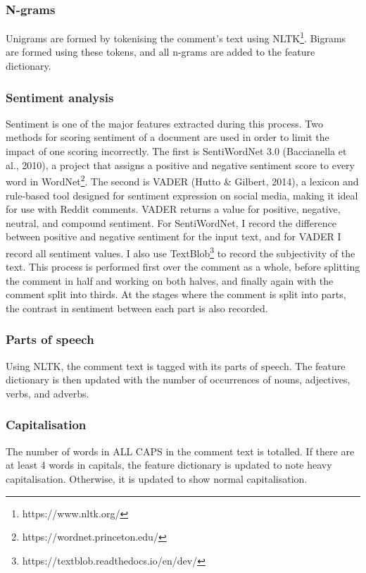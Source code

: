 \documentclass[a4paper,12pt]{article}
\begin{document}
\subsubsection{N-grams}
Unigrams are formed by tokenising the comment's text using NLTK\footnote{https://www.nltk.org/}. Bigrams are formed using these tokens, and all n-grams are added to the feature dictionary.

\subsubsection{Sentiment analysis}
Sentiment is one of the major features extracted during this process. Two methods for scoring sentiment of a document are used in order to limit the impact of one scoring incorrectly. The first is SentiWordNet 3.0 (Baccianella et al., 2010), a project that assigns a positive and negative sentiment score to every word in WordNet\footnote{https://wordnet.princeton.edu/}. The second is VADER (Hutto \& Gilbert, 2014), a lexicon and rule-based tool designed for sentiment expression on social media, making it ideal for use with Reddit comments. VADER returns a value for positive, negative, neutral, and compound sentiment. For SentiWordNet, I record the difference between positive and negative sentiment for the input text, and for VADER I record all sentiment values. I also use TextBlob\footnote{https://textblob.readthedocs.io/en/dev/} to record the subjectivity of the text. This process is performed first over the comment as a whole, before splitting the comment in half and working on both halves, and finally again with the comment split into thirds. At the stages where the comment is split into parts, the contrast in sentiment between each part is also recorded.

\subsubsection{Parts of speech}
Using NLTK, the comment text is tagged with its parts of speech. The feature dictionary is then updated with the number of occurrences of nouns, adjectives, verbs, and adverbs.

\subsubsection{Capitalisation}
The number of words in ALL CAPS in the comment text is totalled. If there are at least 4 words in capitals, the feature dictionary is updated to note heavy capitalisation. Otherwise, it is updated to show normal capitalisation.
\end{document}
